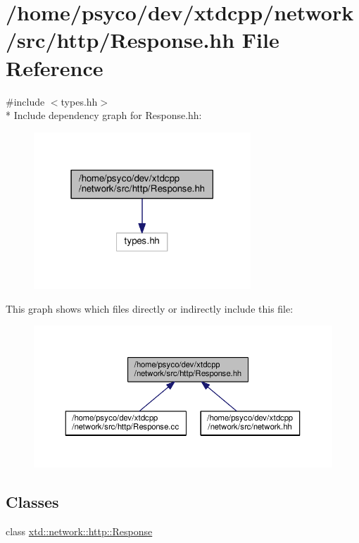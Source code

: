 \hypertarget{Response_8hh}{}\section{/home/psyco/dev/xtdcpp/network/src/http/\+Response.hh File Reference}
\label{Response_8hh}
{\ttfamily \#include $<$types.\+hh$>$}\\*
Include dependency graph for Response.\+hh\+:
\nopagebreak
\begin{figure}[H]
\begin{center}
\leavevmode
\includegraphics[width=231pt]{Response_8hh__incl}
\end{center}
\end{figure}
This graph shows which files directly or indirectly include this file\+:
\nopagebreak
\begin{figure}[H]
\begin{center}
\leavevmode
\includegraphics[width=350pt]{Response_8hh__dep__incl}
\end{center}
\end{figure}
\subsection*{Classes}
\begin{DoxyCompactItemize}
\item 
class \hyperlink{classxtd_1_1network_1_1http_1_1Response}{xtd\+::network\+::http\+::\+Response}
\end{DoxyCompactItemize}

